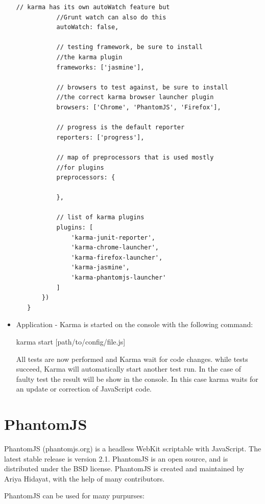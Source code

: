 \documentclass[11pt]{article}
\begin{document}
\begin{itemize}
\begin{lstlisting}[caption=Karma configuration file ]
           // karma has its own autoWatch feature but  
           //Grunt watch can also do this  
           autoWatch: false,  
     
           // testing framework, be sure to install  
           //the karma plugin  
           frameworks: ['jasmine'],  
     
           // browsers to test against, be sure to install   
           //the correct karma browser launcher plugin  
           browsers: ['Chrome', 'PhantomJS', 'Firefox'],  
     
           // progress is the default reporter  
           reporters: ['progress'],  
     
           // map of preprocessors that is used mostly   
           //for plugins  
           preprocessors: {  
     
           },  
     
           // list of karma plugins  
           plugins: [  
               'karma-junit-reporter',  
               'karma-chrome-launcher',  
               'karma-firefox-launcher',  
               'karma-jasmine',  
               'karma-phantomjs-launcher'  
           ]  
       })  
   }  
\end{lstlisting}

\item Application - Karma is started on the console with the following command:

\textdollar{} karma start [path/to/config/file.js]

All tests are now performed and Karma wait for code changes. while tests succeed, Karma will automatically start another test run. In the case of faulty test the result will be show in the console. In this case karma waits for an update or correction of JavaScript code.
\end{itemize}

\section{PhantomJS}

PhantomJS (phantomjs.org) is a headless WebKit scriptable with JavaScript. The latest stable release is version 2.1. PhantomJS is an open source, and is distributed under the BSD license. PhantomJS is created and maintained by Ariya Hidayat, with the help of many contributors.

PhantomJS can be used for many purpurses:
\end{document}
